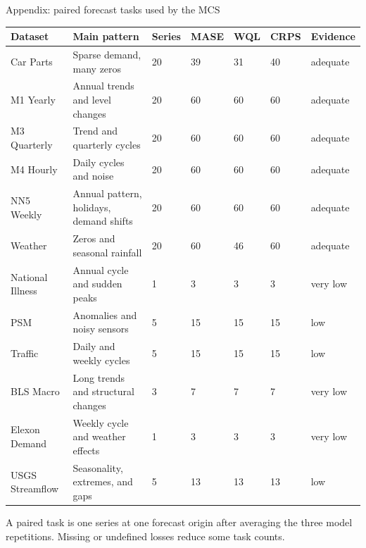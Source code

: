 \documentclass[aspectratio=169,10pt]{beamer}
\begin{document}
\begin{frame}[noframenumbering]{Appendix: paired forecast tasks used by the MCS}
  \vspace{0.03cm}
  \begin{center}
    \fontsize{6.6}{7.4}\selectfont
    \renewcommand{\arraystretch}{1.08}
    \setlength{\tabcolsep}{3.2pt}
    \begin{tabular}{L{2.40cm} L{4.15cm} C{0.80cm} C{1.08cm} C{1.08cm} C{1.08cm} C{1.25cm}}
      \toprule
      \textbf{Dataset} & \textbf{Main pattern} & \textbf{Series} &
      \textbf{MASE} & \textbf{WQL} & \textbf{CRPS} & \textbf{Evidence} \\
      \midrule
      Car Parts & Sparse demand, many zeros & 20 & 39 & 31 & 40 & adequate \\
       M1 Yearly & Annual trends and level changes & 20 & 60 & 60 & 60 & adequate \\
      M3 Quarterly & Trend and quarterly cycles & 20 & 60 & 60 & 60 & adequate \\
       M4 Hourly & Daily cycles and noise & 20 & 60 & 60 & 60 & adequate \\
      NN5 Weekly & Annual pattern, holidays, demand shifts & 20 & 60 & 60 & 60 & adequate \\
       Weather & Zeros and seasonal rainfall & 20 & 60 & 46 & 60 & adequate \\
      National Illness & Annual cycle and sudden peaks & 1 & 3 & 3 & 3 & very low \\
       PSM & Anomalies and noisy sensors & 5 & 15 & 15 & 15 & low \\
      Traffic & Daily and weekly cycles & 5 & 15 & 15 & 15 & low \\
       BLS Macro & Long trends and structural changes & 3 & 7 & 7 & 7 & very low \\
      Elexon Demand & Weekly cycle and weather effects & 1 & 3 & 3 & 3 & very low \\
       USGS Streamflow & Seasonality, extremes, and gaps & 5 & 13 & 13 & 13 & low \\
      \bottomrule
    \end{tabular}
  \end{center}

  \vspace{0.08cm}
  \begin{center}\fontsize{6.5}{7.3}\selectfont\color{Muted}
    A paired task is one series at one forecast origin after averaging the three
    model repetitions. Missing or undefined losses reduce some task counts.
  \end{center}
\end{frame}
\end{document}
